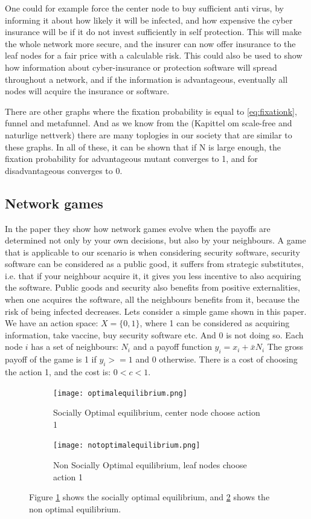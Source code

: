 One could for example force the center node to buy sufficient anti virus, 
by informing it about how likely it will be infected, and how expensive the cyber insurance will be if 
it do not invest sufficiently in self protection. This will make the whole network more secure, 
and the insurer can now offer insurance to the leaf nodes for a fair price with a calculable risk. 
This could also be used to show how information about cyber-insurance or protection software will
spread throughout a network, and if the information is advantageous, eventually all nodes will acquire
the insurance or software.
    
There are other graphs where the fixation probability is equal to \ref{eq:fixationk}, funnel and
metafunnel. And as we know from the (Kapittel om scale-free and naturlige nettverk) there are many
toplogies in our society that are similar to these graphs.  In all of these, it can be
shown that if N is large enough, the fixation probability for advantageous mutant converges to 1, 
and for disadvantageous converges to 0.

\subsection{Network games}
In the paper \cite{networkgames} they show how network games evolve when the payoffs are determined not only by your own decisions, but also by your neighbours. 
A game that is applicable to our scenario is when considering security software, 
security software can be considered as a public good, it suffers from strategic substitutes, i.e. 
that if your neighbour acquire it, it gives you less incentive to also acquiring the software. 
Public goods and security also benefits from positive externalities, when one acquires the software, 
all the neighbours benefits from it, because the risk of being infected decreases.
Lets consider a simple game shown in this paper.
We have an action space: $X=\{0,1\}$, where 1 can be considered as acquiring information, take vaccine, buy security software etc. And 0 is not doing so.
Each node $i$ has a set of neighbours: $N_{i} $ and a payoff function $y_{i}=x_{i}+\bar{x}N_{i}$
The gross payoff of the game is 1 if $y_{i}>=1$ and 0 otherwise. There is a cost of choosing the action 1, and the cost is: $0<c<1$.
\begin{figure}[h]
\centering
\begin{subfigure}{.4\textwidth}
  \centering
  \texttt{[image: optimalequilibrium.png]}
  \caption{\label{fig:optequi} Socially Optimal equilibrium, center node choose action 1}
\end{subfigure}
\quad
\begin{subfigure}{.4\textwidth}
  \centering
  \texttt{[image: notoptimalequilibrium.png]}
  \caption{\label{fig:notoptequi} Non Socially Optimal equilibrium, leaf nodes choose action 1}
\end{subfigure}
\caption{\label{fig:starequi} Figure \ref{fig:optequi} shows the socially optimal equilibrium, and \ref{fig:notoptequi} shows the non optimal equilibrium.}

\end{figure}

